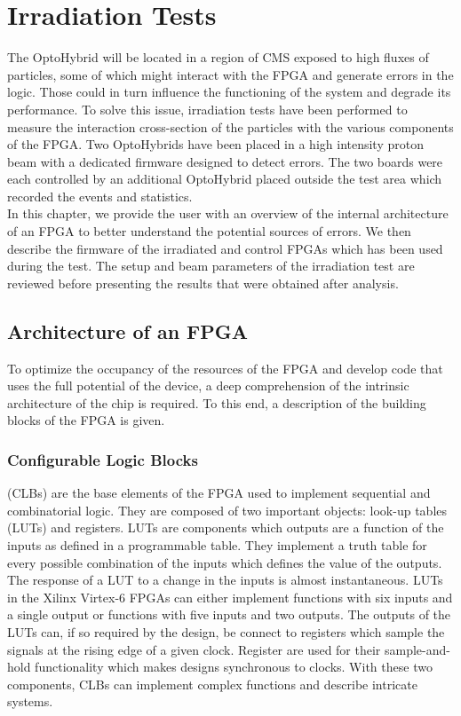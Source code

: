 \chapter{Irradiation Tests}
\label{chap:II-6-irradiation}

  The OptoHybrid will be located in a region of CMS exposed to high fluxes of particles, some of which might interact with the FPGA and generate errors in the logic. Those could in turn influence the functioning of the system and degrade its performance. To solve this issue, irradiation tests have been performed to measure the interaction cross-section of the particles with the various components of the FPGA. Two OptoHybrids have been placed in a high intensity proton beam with a dedicated firmware designed to detect errors. The two boards were each controlled by an additional OptoHybrid placed outside the test area which recorded the events and statistics. \\

  In this chapter, we provide the user with an overview of the internal architecture of an FPGA to better understand the potential sources of errors. We then describe the firmware of the irradiated and control FPGAs which has been used during the test. The setup and beam parameters of the irradiation test are reviewed before presenting the results that were obtained after analysis.

  \section{Architecture of an FPGA}

    To optimize the occupancy of the resources of the FPGA and develop code that uses the full potential of the device, a deep comprehension of the intrinsic architecture of the chip is required. To this end, a description of the building blocks of the FPGA is given.

    \subsection{Configurable Logic Blocks}

      (CLBs) \cite{VIRTEX-CLB} are the base elements of the FPGA used to implement sequential and combinatorial logic. They are composed of two important objects: look-up tables (LUTs) and registers. LUTs are components which outputs are a function of the inputs as defined in a programmable table. They implement a truth table for every possible combination of the inputs which defines the value of the outputs. The response of a LUT to a change in the inputs is almost instantaneous. LUTs in the Xilinx Virtex-6 FPGAs can either implement functions with six inputs and a single output or functions with five inputs and two outputs. The outputs of the LUTs can, if so required by the design, be connect to registers which sample the signals at the rising edge of a given clock. Register are used for their sample-and-hold functionality which makes designs synchronous to clocks. With these two components, CLBs can implement complex functions and describe intricate systems. \\

